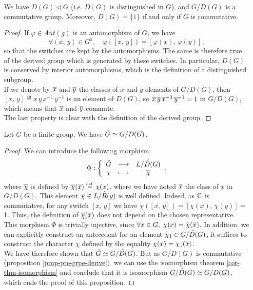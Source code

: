 \begin{prop}
\label{prop-pte-grpe-derive}
We have $ D(G) \lhd G$ (i.e. $ D(G)$ is distinguished in $G$), and $ G/D(G)$ is a commutative group. Moreover, $ D(G) = \{1\}$ if and only if $G$ is commutative.
\end{prop}
\begin{proof}
If $\varphi \in Aut(g)$ is an automorphism of $G$, we have
\begin{equation*}
\forall (x, \, y) \in G^2, \quad \varphi ([x, \, y]) = [\varphi (x), \, \varphi (y)],
\end{equation*}
so that the switches are kept by the automorphisms. The same is therefore true of the derived group which is generated by these switches. In particular, $ D(G)$ is conserved by interior automorphisms, which is the definition of a distinguished subgroup. \\If we denote by $\overline{x}$ and $\overline{y}$ the classes of $ x $ and $ y $ elements of $ G/D(G)$, then $[x, \, y] \eqdef x \, y \, x^{-1} \, y^{- 1}$ is an element of $ D(G)$, so $\overline{x} \, \overline{y} \, \overline{x}^{-1} \, \overline{y}^{- 1} = 1$ in $ G/D(G)$, which means that $\overline{x}$ and $\overline{y}$ commute. \\The last property is clear with the definition of the derived group.
\end{proof}

\begin{prop}
\label{prop-descr-dual-grpe-derive}
Let $G$ be a finite group. We have $\hat{G} \simeq G/D(G)$.
\end{prop}
\begin{proof}
We can introduce the following morphism:
\begin{equation*}
\Phi: {\left\{ \begin{array}{ccc} \hat{G} & \longrightarrow & \hat{L/D(G)} \\ \chi & \longmapsto & \overline{\chi} \end{array} \right.},
\end{equation*}
where $\overline{\chi}$ is defined by $\overline{\chi}(\overline{x}) \stackrel{\mbox{\upshape\tiny def.}}{=} \chi(x)$, where we have noted $\overline{x}$ the class of $ x $ in $ G/D(G)$. This element $\overline{\chi} \in \hat{L/R(g)}$ is well defined. Indeed, as $\mathbb{C}$ is commutative, for any switch $[x, \, y]$ we have $\chi([x, \, y]) = [\chi(x), \, \chi( y)] = $ 1. Thus, the definition of $\overline{\chi}(\overline{x})$ does not depend on the chosen representative. \\This morphism $\Phi $ is trivially injective, since $\forall x \in G, \; \chi(x) = \overline{\chi}(\overline{x})$. In addition, we can explicitly construct an antecedent for an element $\chi_1 \in \hat{G/D(G)}$, it suffices to construct the character $\chi$ defined by the equality $\chi(x) = \chi_1(\overline{x})$. \\We have therefore shown that $\hat{G} \simeq \hat{G/D(G)}$. But as $ G/D(G)$ is commutative (proposition \ref{prop-pte-grpe-derive}), we can use the isomorphism theorem \ref{cor-thm-isomorphism} and conclude that it is isomorphism $\hat{G/D(G)} \simeq G/D(G)$, which ends the proof of this proposition.
\end{proof}


